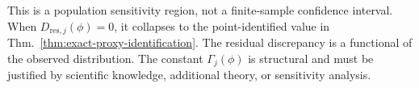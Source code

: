 This is a population sensitivity region, not a finite-sample confidence interval. When $D_{\mathrm{res},j}(\phi)=0$, it collapses to the point-identified value in Thm.~\ref{thm:exact-proxy-identification}. The residual discrepancy is a functional of the observed distribution.
The constant $\Gamma_j(\phi)$ is structural and must be justified by scientific knowledge, additional theory, or sensitivity analysis.

